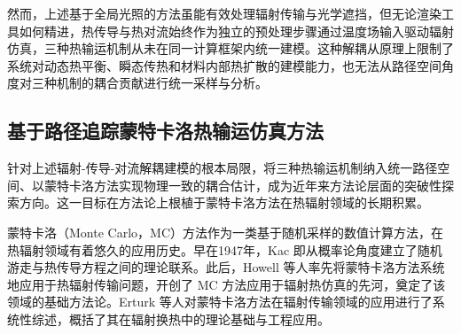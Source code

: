 然而，上述基于全局光照的方法虽能有效处理辐射传输与光学遮挡，但无论渲染工具如何精进，热传导与热对流始终作为独立的预处理步骤通过温度场输入驱动辐射仿真，三种热输运机制从未在同一计算框架内统一建模。这种解耦从原理上限制了系统对动态热平衡、瞬态传热和材料内部热扩散的建模能力，也无法从路径空间角度对三种机制的耦合贡献进行统一采样与分析。

\subsection{基于路径追踪蒙特卡洛热输运仿真方法}

针对上述辐射-传导-对流解耦建模的根本局限，将三种热输运机制纳入统一路径空间、以蒙特卡洛方法实现物理一致的耦合估计，成为近年来方法论层面的突破性探索方向。这一目标在方法论上根植于蒙特卡洛方法在热辐射领域的长期积累。

蒙特卡洛（Monte Carlo，MC）方法作为一类基于随机采样的数值计算方法，在热辐射领域有着悠久的应用历史。早在1947年，Kac 即从概率论角度建立了随机游走与热传导方程之间的理论联系\cite{kacRandomWalkTheory1947}。此后，Howell 等人率先将蒙特卡洛方法系统地应用于热辐射传输问题，开创了 MC 方法应用于辐射热仿真的先河，奠定了该领域的基础方法论\cite{howellMonteCarloSolution1964,howellApplicationMonteCarlo1969}。Erturk 等人对蒙特卡洛方法在辐射传输领域的应用进行了系统性综述，概括了其在辐射换热中的理论基础与工程应用\cite{erturkMonteCarloMethods2017}。


